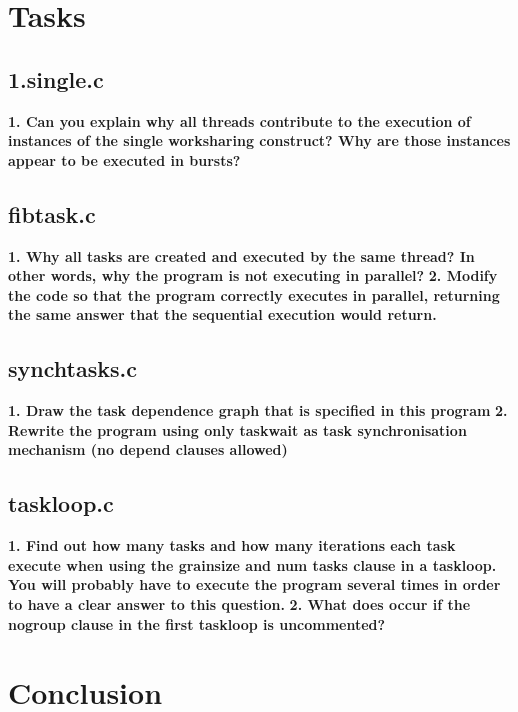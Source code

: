 \documentclass[12]{article}
\begin{document}
\section{Tasks}
\subsection{1.single.c}
\textbf{1. Can you explain why all threads contribute to the execution of instances of the single worksharing
construct? Why are those instances appear to be executed in bursts?}
\subsection{fibtask.c}
\textbf{1. Why all tasks are created and executed by the same thread? In other words, why the program
is not executing in parallel?}
\textbf{2. Modify the code so that the program correctly executes in parallel, returning the same answer
that the sequential execution would return.}
\subsection{synchtasks.c}
\textbf{1. Draw the task dependence graph that is specified in this program}
\textbf{2. Rewrite the program using only taskwait as task synchronisation mechanism (no depend clauses allowed)}
\subsection{taskloop.c}
\textbf{1. Find out how many tasks and how many iterations each task execute when using the grainsize
and num tasks clause in a taskloop. You will probably have to execute the program several times in order to have a clear answer to this question.}
\textbf{2. What does occur if the nogroup clause in the first taskloop is uncommented?}

\section{Conclusion}
\end{document}
